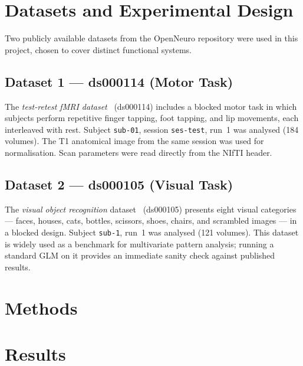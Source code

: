 \documentclass[12pt,a4paper]{article}
\begin{document}
\section{Datasets and Experimental Design}
\label{sec:datasets}

Two publicly available datasets from the OpenNeuro repository were
used in this project, chosen to cover distinct functional systems.

\subsection{Dataset 1 — ds000114 (Motor Task)}
The \textit{test-retest fMRI dataset}~\cite{Gorgolewski2013}
(ds000114) includes a blocked motor task in which subjects perform
repetitive finger tapping, foot tapping, and lip movements, each
interleaved with rest. Subject \texttt{sub-01}, session
\texttt{ses-test}, run~1 was analysed (184 volumes). The T1
anatomical image from the same session was used for normalisation.
Scan parameters were read directly from the NIfTI header.

\subsection{Dataset 2 — ds000105 (Visual Task)}
The \textit{visual object recognition} dataset~\cite{Haxby2001}
(ds000105) presents eight visual categories — faces, houses, cats,
bottles, scissors, shoes, chairs, and scrambled images — in a
blocked design. Subject \texttt{sub-1}, run~1 was analysed (121
volumes). This dataset is widely used as a benchmark for multivariate
pattern analysis; running a standard GLM on it provides an immediate
sanity check against published results.

\section{Methods}
\label{sec:methods}


\section{Results}
\label{sec:results}


\end{document}
